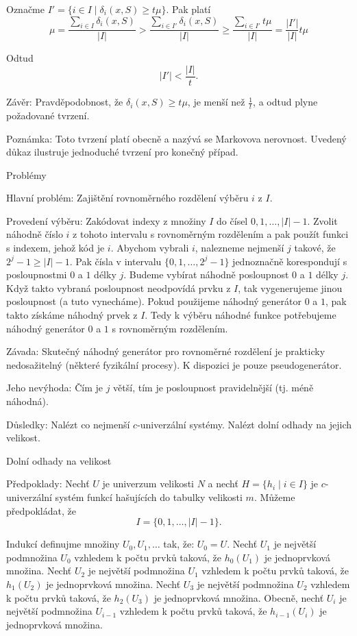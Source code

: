 \documentclass[a4paper,12pt]{article}
\begin{document}
Označme $I'=\{i\in I\mid\delta_i(x,S)\ge t\mu \}$. Pak platí
$$\mu =\frac {\sum_{i\in I}\delta_i(x,S)}{|I|}>\frac {\sum_{i\in 
I'}\delta_i(x,S)}{|I|}\ge\frac {\sum_{i\in I'}t\mu}{|I|}=\frac {|
I'|}{|I|}t\mu$$

Odtud
$$|I'|<\frac {|I|}t.$$

Závěr: Pravděpodobnost, že $\delta_i(x,S)\ge 
t\mu$, je menší 
než $\frac 1t$, a odtud plyne požadované tvrzení. 

Poznámka: Toto tvrzení platí obecně a nazývá 
se Markovova nerovnost. Uvedený důkaz 
ilustruje jednoduché tvrzení pro ko\-neč\-ný případ.

\subhead
Problémy
\endsubhead

Hlavní problém: Zajištění rovnoměrného rozdělení 
výběru $i$ z $I$.

Provedení výběru: Zak\'odovat indexy z množiny $
I$ do 
čísel $0,1,\dots,|I|-1$. Zvolit náhodně číslo $
i$ z tohoto 
intervalu s rovnoměrným rozdělením a pak použít 
funkci s indexem, jehož k\'od je $i$. Abychom vybrali $i$, nalezneme 
nejmenší $j$ takové, že $2^j-1\ge |I|-1$. Pak čísla v 
intervalu $\{0,1,\dots,2^j-1\}$ jednoznačně korespondují s 
posloupnostmi $0$ a $1$ délky $j$. Budeme vybírat náhodně 
posloupnost $0$ a $1$ délky $j$. Když takto vybraná posloupnost neodpovídá prvku z $I$, tak vygenerujeme jinou posloupnost (a tuto vynecháme). Pokud použijeme náhodný generátor $0$ a $1$, pak takto získáme náhodný prvek z $I$. Tedy k výběru náhodné funkce potřebujeme  
náhodný generátor $0$ a $1$ s rovnoměrným rozděle\-ním.

Závada: Skutečný náhodný generátor pro 
rovnoměrné rozděle\-ní je prakticky nedosažitelný 
(některé fyzikální procesy). K dispozici je pouze 
pseudogenerátor. 

Jeho nevýhoda: \v Cím je $j$ větší, tím je 
posloupnost pravidelnější (tj. méně náhodná). 

Důsledky: Nalézt co nejmenší $c$-univerzální 
systémy. Nalézt dolní odhady na jejich velikost.

\subhead
Dolní odhady na velikost
\endsubhead

Předpoklady: Nech\v t $U$ je univerzum velikosti $N$ a nech\v t 
$H=\{h_i\mid i\in I\}$ je $c$-univerzální systém funkcí hašujících do tabulky velikosti 
$m$. Můžeme předpoklá\-dat, že 
$$I=\{0,1,\dots,|I|-1\}.$$

Indukcí definujme množiny $U_0,U_1,\dots$ tak, že: 
$U_0=U$.\newline 
Nech\v t $U_1$ je největší podmnožina $U_0$ vzhledem k počtu 
prvků taková, že $h_0(U_1)$ je jednoprvková 
množina. \newline 
Nech\v t $U_2$ je největší podmnožina $U_1$ vzhledem k počtu 
prvků taková, že $h_1(U_2)$ je jednoprvková 
množina. \newline 
Nech\v t $U_3$ je největší podmnožina $U_2$ vzhledem k počtu 
prvků taková, že $h_2(U_3)$ je jednoprvková 
množina. \newline 
Obecně, nech\v t $U_i$ je největší podmnožina $U_{
i-1}$ vzhledem k počtu 
prvků taková, že $h_{i-1}(U_i)$ je jednoprvková 
množina. 
\end{document}
